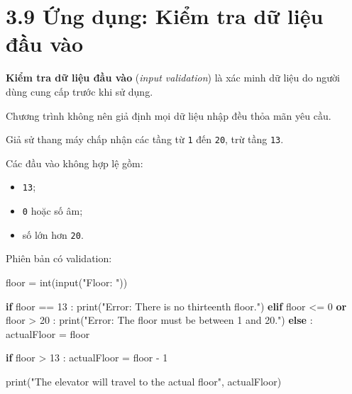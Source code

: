 \documentclass[
  11pt,
  a4paper,
]{article}
\newenvironment{Shaded}{}{}
\newcommand{\BuiltInTok}[1]{\textcolor[rgb]{0.00,0.50,0.00}{#1}}
\newcommand{\ControlFlowTok}[1]{\textcolor[rgb]{0.00,0.44,0.13}{\textbf{#1}}}
\newcommand{\DecValTok}[1]{\textcolor[rgb]{0.25,0.63,0.44}{#1}}
\newcommand{\KeywordTok}[1]{\textcolor[rgb]{0.00,0.44,0.13}{\textbf{#1}}}
\newcommand{\NormalTok}[1]{#1}
\newcommand{\OperatorTok}[1]{\textcolor[rgb]{0.40,0.40,0.40}{#1}}
\newcommand{\StringTok}[1]{\textcolor[rgb]{0.25,0.44,0.63}{#1}}
\providecommand{\tightlist}{%
  \setlength{\itemsep}{0pt}\setlength{\parskip}{0pt}}
\begin{document}
\section{3.9 Ứng dụng: Kiểm tra dữ liệu đầu
vào}\label{ux1ee9ng-dux1ee5ng-kiux1ec3m-tra-dux1eef-liux1ec7u-ux111ux1ea7u-vuxe0o}

\textbf{Kiểm tra dữ liệu đầu vào} (\emph{input validation}) là xác minh
dữ liệu do người dùng cung cấp trước khi sử dụng.

Chương trình không nên giả định mọi dữ liệu nhập đều thỏa mãn yêu cầu.

Giả sử thang máy chấp nhận các tầng từ \texttt{1} đến \texttt{20}, trừ
tầng \texttt{13}.

Các đầu vào không hợp lệ gồm:

\begin{itemize}
\tightlist
\item
  \texttt{13};
\item
  \texttt{0} hoặc số âm;
\item
  số lớn hơn \texttt{20}.
\end{itemize}

Phiên bản có validation:

\begin{Shaded}
\begin{Highlighting}[]
\NormalTok{floor }\OperatorTok{=} \BuiltInTok{int}\NormalTok{(}\BuiltInTok{input}\NormalTok{(}\StringTok{"Floor: "}\NormalTok{))}

\ControlFlowTok{if}\NormalTok{ floor }\OperatorTok{==} \DecValTok{13}\NormalTok{ :}
    \BuiltInTok{print}\NormalTok{(}\StringTok{"Error: There is no thirteenth floor."}\NormalTok{)}
\ControlFlowTok{elif}\NormalTok{ floor }\OperatorTok{\textless{}=} \DecValTok{0} \KeywordTok{or}\NormalTok{ floor }\OperatorTok{\textgreater{}} \DecValTok{20}\NormalTok{ :}
    \BuiltInTok{print}\NormalTok{(}\StringTok{"Error: The floor must be between 1 and 20."}\NormalTok{)}
\ControlFlowTok{else}\NormalTok{ :}
\NormalTok{    actualFloor }\OperatorTok{=}\NormalTok{ floor}

    \ControlFlowTok{if}\NormalTok{ floor }\OperatorTok{\textgreater{}} \DecValTok{13}\NormalTok{ :}
\NormalTok{        actualFloor }\OperatorTok{=}\NormalTok{ floor }\OperatorTok{{-}} \DecValTok{1}

    \BuiltInTok{print}\NormalTok{(}\StringTok{"The elevator will travel to the actual floor"}\NormalTok{, actualFloor)}
\end{Highlighting}
\end{Shaded}
\end{document}
